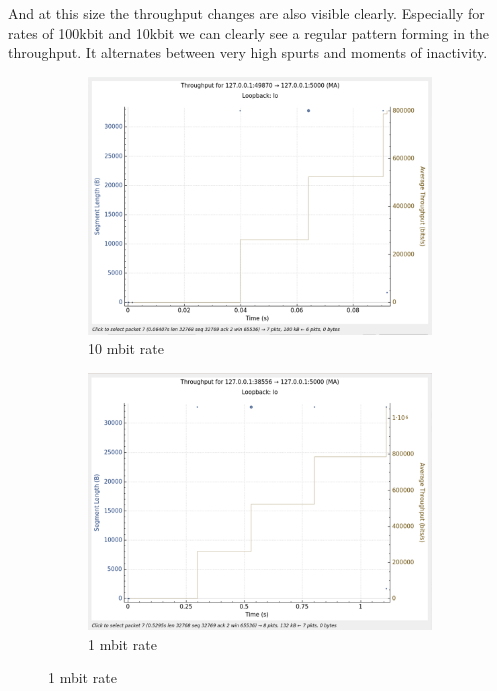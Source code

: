 \documentclass{report}
\begin{document}
And at this size the throughput changes are also visible clearly. Especially for rates of 100kbit and 10kbit we can clearly see a regular pattern forming in the throughput. It alternates between very high spurts and moments of inactivity.
\begin{figure}[H]
    \centering
    \begin{subfigure}[b]{0.45\textwidth}
        \centering
        \includegraphics[width=\textwidth]{Pics/Cubic/r10mbit_s100k_th}
        \caption{10 mbit rate}
    \end{subfigure}
    \hfill
    \begin{subfigure}[b]{0.45\textwidth}
        \centering
        \includegraphics[width=\textwidth]{Pics/Cubic/r1mbit_s100k_th}
        \caption{1 mbit rate}
    \end{subfigure}
    \medskip


\end{figure}
\end{document}
